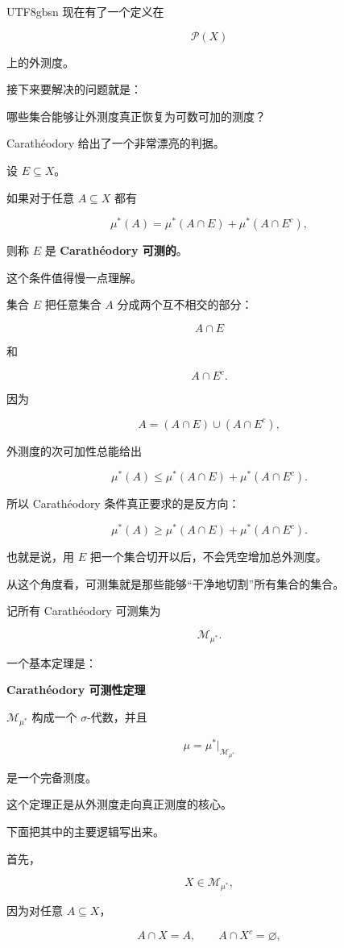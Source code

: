 \documentclass[11pt]{article}
\begin{document}
\begin{CJK*}{UTF8}{gbsn}
现在有了一个定义在

\[
\mathcal{P}(X)
\]

上的外测度。

接下来要解决的问题就是：

哪些集合能够让外测度真正恢复为可数可加的测度？

Carathéodory 给出了一个非常漂亮的判据。

设 $E\subseteq X$。

如果对于任意 $A\subseteq X$ 都有

\[
\mu^{*}(A)=\mu^{*}(A\cap E)+\mu^{*}(A\cap E^{c}),
\]

则称 $E$ 是 \textbf{Carathéodory 可测的}。

这个条件值得慢一点理解。

集合 $E$ 把任意集合 $A$ 分成两个互不相交的部分：

\[
A\cap E
\]

和

\[
A\cap E^{c}.
\]

因为

\[
A=(A\cap E)\cup(A\cap E^{c}),
\]

外测度的次可加性总能给出

\[
\mu^{*}(A)\leq\mu^{*}(A\cap E)+\mu^{*}(A\cap E^{c}).
\]

所以 Carathéodory 条件真正要求的是反方向：

\[
\mu^{*}(A)\geq\mu^{*}(A\cap E)+\mu^{*}(A\cap E^{c}).
\]

也就是说，用 $E$ 把一个集合切开以后，不会凭空增加总外测度。

从这个角度看，可测集就是那些能够“干净地切割”所有集合的集合。

记所有 Carathéodory 可测集为

\[
\mathcal{M}_{\mu^{*}}.
\]

一个基本定理是：

\textbf{Carathéodory 可测性定理}

$\mathcal{M}_{\mu^{*}}$ 构成一个 $\sigma$-代数，并且

\[
\mu=\mu^{*}|_{\mathcal{M}_{\mu^{*}}}
\]

是一个完备测度。

这个定理正是从外测度走向真正测度的核心。

下面把其中的主要逻辑写出来。

首先，

\[
X\in\mathcal{M}_{\mu^{*}},
\]

因为对任意 $A\subseteq X$，

\[
A\cap X=A,\qquad A\cap X^{c}=\varnothing,
\]


\end{CJK*}
\end{document}
